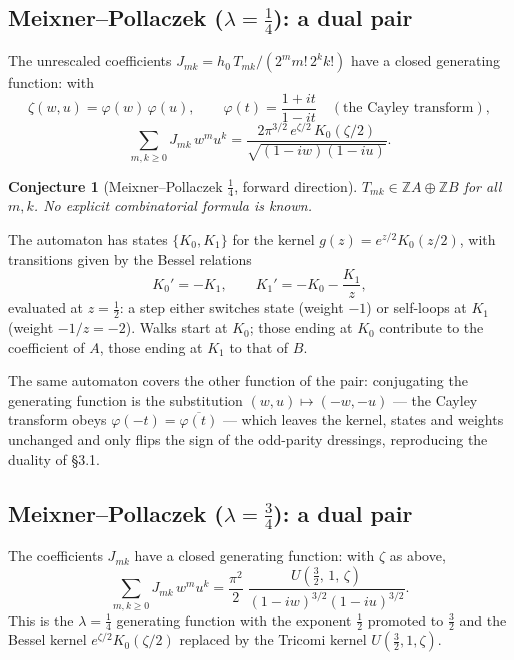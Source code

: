 \documentclass[11pt,a4paper]{article}
\newtheorem{conjecture}[theorem]{Conjecture}
\theoremstyle{definition}
\newcommand{\Z}{\mathbb{Z}}
\begin{document}
\subsection{Meixner--Pollaczek ($\lambda = \tfrac14$): a dual pair}

The unrescaled coefficients
$J_{mk} = h_0\, T_{mk}/(2^m m!\, 2^k k!)$ have a closed generating
function: with
\[
  \zeta(w,u) = \varphi(w)\,\varphi(u), \qquad
  \varphi(t) = \frac{1+it}{1-it}
  \quad (\text{the Cayley transform}),
\]
\[
  \sum_{m,k \ge 0} J_{mk}\, w^m u^k
  = \frac{2\pi^{3/2}\, e^{\zeta/2}\, K_0(\zeta/2)}
         {\sqrt{(1-iw)(1-iu)}} .
\]

\begin{tcolorbox}[colback=blue!5, colframe=blue!5, boxrule=0pt, sharp corners]
\begin{conjecture}[Meixner--Pollaczek $\tfrac14$, forward direction]\label{conj:mp}
$T_{mk} \in \Z A \oplus \Z B$ for all $m, k$. No explicit
combinatorial formula is known.
\end{conjecture}
\end{tcolorbox}

The automaton has states $\{K_0, K_1\}$ for the kernel
$g(z) = e^{z/2} K_0(z/2)$, with transitions given by the Bessel
relations
\[
  K_0' = -K_1, \qquad K_1' = -K_0 - \frac{K_1}{z},
\]
evaluated at $z = \tfrac12$: a step either switches state (weight
$-1$) or self-loops at $K_1$ (weight $-1/z = -2$). Walks start at
$K_0$; those ending at $K_0$ contribute to the coefficient of $A$,
those ending at $K_1$ to that of $B$.

The same automaton covers the other function of the pair:
conjugating the generating function is the substitution
$(w,u) \mapsto (-w,-u)$ --- the Cayley transform obeys
$\varphi(-t) = \overline{\varphi(t)}$ --- which leaves the kernel,
states and weights unchanged and only flips the sign of the
odd-parity dressings, reproducing the duality of \S3.1.

\subsection{Meixner--Pollaczek ($\lambda = \tfrac34$): a dual pair}

The coefficients $J_{mk}$ have a closed generating function: with
$\zeta$ as above,
\[
  \sum_{m,k \ge 0} J_{mk}\, w^m u^k
  = \frac{\pi^2}{2}\;
    \frac{U\!\left(\tfrac32,\,1,\,\zeta\right)}
         {(1-iw)^{3/2}(1-iu)^{3/2}} .
\]
This is the $\lambda = \tfrac14$ generating function with the exponent
$\tfrac12$ promoted to $\tfrac32$ and the Bessel kernel
$e^{\zeta/2} K_0(\zeta/2)$ replaced by the Tricomi kernel
$U(\tfrac32, 1, \zeta)$.
\end{document}
